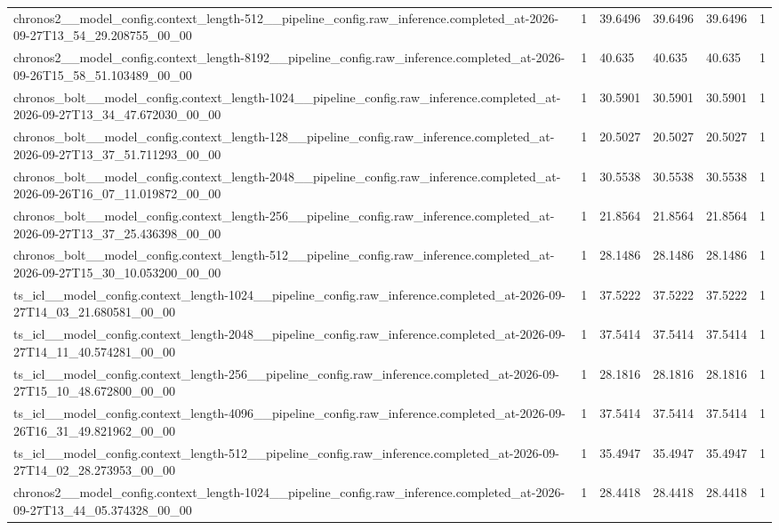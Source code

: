\begin{tabular}{llllll}
chronos2\_\_model\_config.context\_length-512\_\_pipeline\_config.raw\_inference.completed\_at-2026-09-27T13\_54\_29.208755\_00\_00 & 1 & 39.6496 & 39.6496 & 39.6496 & 1 \\
chronos2\_\_model\_config.context\_length-8192\_\_pipeline\_config.raw\_inference.completed\_at-2026-09-26T15\_58\_51.103489\_00\_00 & 1 & 40.635 & 40.635 & 40.635 & 1 \\
chronos\_bolt\_\_model\_config.context\_length-1024\_\_pipeline\_config.raw\_inference.completed\_at-2026-09-27T13\_34\_47.672030\_00\_00 & 1 & 30.5901 & 30.5901 & 30.5901 & 1 \\
chronos\_bolt\_\_model\_config.context\_length-128\_\_pipeline\_config.raw\_inference.completed\_at-2026-09-27T13\_37\_51.711293\_00\_00 & 1 & 20.5027 & 20.5027 & 20.5027 & 1 \\
chronos\_bolt\_\_model\_config.context\_length-2048\_\_pipeline\_config.raw\_inference.completed\_at-2026-09-26T16\_07\_11.019872\_00\_00 & 1 & 30.5538 & 30.5538 & 30.5538 & 1 \\
chronos\_bolt\_\_model\_config.context\_length-256\_\_pipeline\_config.raw\_inference.completed\_at-2026-09-27T13\_37\_25.436398\_00\_00 & 1 & 21.8564 & 21.8564 & 21.8564 & 1 \\
chronos\_bolt\_\_model\_config.context\_length-512\_\_pipeline\_config.raw\_inference.completed\_at-2026-09-27T15\_30\_10.053200\_00\_00 & 1 & 28.1486 & 28.1486 & 28.1486 & 1 \\
ts\_icl\_\_model\_config.context\_length-1024\_\_pipeline\_config.raw\_inference.completed\_at-2026-09-27T14\_03\_21.680581\_00\_00 & 1 & 37.5222 & 37.5222 & 37.5222 & 1 \\
ts\_icl\_\_model\_config.context\_length-2048\_\_pipeline\_config.raw\_inference.completed\_at-2026-09-27T14\_11\_40.574281\_00\_00 & 1 & 37.5414 & 37.5414 & 37.5414 & 1 \\
ts\_icl\_\_model\_config.context\_length-256\_\_pipeline\_config.raw\_inference.completed\_at-2026-09-27T15\_10\_48.672800\_00\_00 & 1 & 28.1816 & 28.1816 & 28.1816 & 1 \\
ts\_icl\_\_model\_config.context\_length-4096\_\_pipeline\_config.raw\_inference.completed\_at-2026-09-26T16\_31\_49.821962\_00\_00 & 1 & 37.5414 & 37.5414 & 37.5414 & 1 \\
ts\_icl\_\_model\_config.context\_length-512\_\_pipeline\_config.raw\_inference.completed\_at-2026-09-27T14\_02\_28.273953\_00\_00 & 1 & 35.4947 & 35.4947 & 35.4947 & 1 \\
chronos2\_\_model\_config.context\_length-1024\_\_pipeline\_config.raw\_inference.completed\_at-2026-09-27T13\_44\_05.374328\_00\_00 & 1 & 28.4418 & 28.4418 & 28.4418 & 1 \\

\end{tabular}
